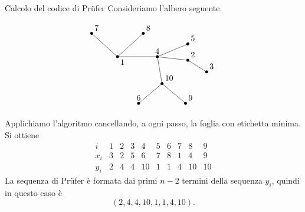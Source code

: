 \documentclass[a4paper]{article}
\begin{document}
\begin{snippetexample}{Calcolo del codice di Prüfer}
    Consideriamo l'albero seguente.

    \[
        \begin{tikzpicture}[scale=1]
            \coordinate (v1) at (0,0);
            \coordinate (v7) at (-1.1,1);
            \coordinate (v8) at (1.1,1);
            \coordinate (v4) at (1.7,0);
            \coordinate (v5) at (3,0.55);
            \coordinate (v2) at (3,-0.15);
            \coordinate (v3) at (3.8,-0.65);
            \coordinate (v10) at (1.9,-1.15);
            \coordinate (v6) at (0.9,-2);
            \coordinate (v9) at (2.9,-2);

            \draw (v1)--(v7);
            \draw (v1)--(v8);
            \draw (v1)--(v4);
            \draw (v4)--(v5);
            \draw (v4)--(v2);
            \draw (v2)--(v3);
            \draw (v4)--(v10);
            \draw (v10)--(v6);
            \draw (v10)--(v9);

            \fill (v1) circle (1.8pt);
            \node[below right] at (v1) {\(1\)};
            \fill (v2) circle (1.8pt);
            \node[above right] at (v2) {\(2\)};
            \fill (v3) circle (1.8pt);
            \node[above right] at (v3) {\(3\)};
            \fill (v4) circle (1.8pt);
            \node[above] at (v4) {\(4\)};
            \fill (v5) circle (1.8pt);
            \node[above right] at (v5) {\(5\)};
            \fill (v6) circle (1.8pt);
            \node[above] at (v6) {\(6\)};
            \fill (v7) circle (1.8pt);
            \node[above right] at (v7) {\(7\)};
            \fill (v8) circle (1.8pt);
            \node[above right] at (v8) {\(8\)};
            \fill (v9) circle (1.8pt);
            \node[above right] at (v9) {\(9\)};
            \fill (v10) circle (1.8pt);
            \node[above right] at (v10) {\(10\)};
        \end{tikzpicture}
    \]

    Applichiamo l'algoritmo cancellando, a ogni passo, la foglia con etichetta minima. Si ottiene
    \[
        \begin{array}{c|ccccccccc}
            i   & 1 & 2 & 3 & 4  & 5 & 6 & 7 & 8  & 9  \\
            \hline
            x_i & 3 & 2 & 5 & 6  & 7 & 8 & 1 & 4  & 9  \\
            y_i & 2 & 4 & 4 & 10 & 1 & 1 & 4 & 10 & 10
        \end{array}
    \]
    La sequenza di Prüfer è formata dai primi \(n-2\) termini della sequenza \(y_i\), quindi in questo caso è
    \[
        (2,4,4,10,1,1,4,10).
    \]
\end{snippetexample}
\end{document}
